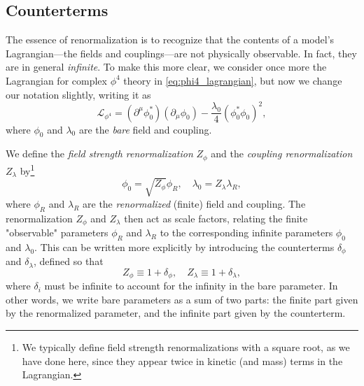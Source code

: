 \subsection{Counterterms}\label{sec:counterterms}
The essence of renormalization is to recognize that the contents of a model's Lagrangian---the fields and couplings---are not physically observable.
In fact, they are in general \emph{infinite}.
To make this more clear, we consider once more the Lagrangian for complex $\phi^4$ theory in \cref{eq:phi4_lagrangian}, but now we change our notation slightly, writing it as
\begin{equation}\label{eq:phi4_lagrangian_bare}
    \mathcal{L}_{\phi^4} = (\partial^\mu\phi_0^*)(\partial_\mu\phi_0) - \frac{\lambda_0}{4} (\phi_0^*\phi_0)^2,
\end{equation}
where $\phi_0$ and $\lambda_0$ are the \emph{bare} field and coupling.

We define the \emph{field strength renormalization} $Z_\phi$ and the \emph{coupling renormalization} $Z_\lambda$ by\footnote{We typically define field strength renormalizations with a square root, as we have done here, since they appear twice in kinetic (and mass) terms in the Lagrangian.}
\begin{equation}
    \phi_0 = \sqrt{Z_\phi} \phi_R, \quad \lambda_0 = Z_\lambda \lambda_R,
\end{equation}
where $\phi_R$ and $\lambda_R$ are the \emph{renormalized} (finite) field and coupling.
The renormalization $Z_\phi$ and $Z_\lambda$ then act as scale factors, relating the finite "observable" parameters $\phi_R$ and $\lambda_R$ to the corresponding infinite parameters $\phi_0$ and $\lambda_0$.
This can be written more explicitly by introducing the counterterms $\delta_\phi$ and $\delta_\lambda$, defined so that
\begin{equation}
    Z_\phi \equiv 1 + \delta_\phi, \quad Z_\lambda \equiv 1 + \delta_\lambda,
\end{equation}
where $\delta_i$ must be infinite to account for the infinity in the bare parameter.
In other words, we write bare parameters as a sum of two parts: the finite part given by the renormalized parameter, and the infinite part given by the counterterm.

